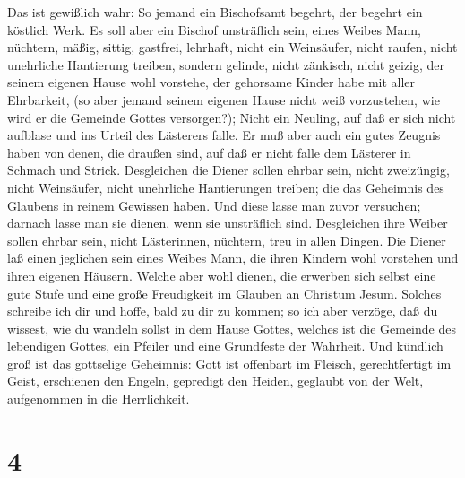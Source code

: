  Das ist gewißlich wahr: So jemand ein Bischofsamt begehrt,
der begehrt ein köstlich Werk.  Es soll aber ein Bischof
unsträflich sein, eines Weibes Mann, nüchtern, mäßig, sittig, gastfrei,
lehrhaft,  nicht ein Weinsäufer, nicht raufen, nicht
unehrliche Hantierung treiben, sondern gelinde, nicht zänkisch, nicht
geizig,  der seinem eigenen Hause wohl vorstehe, der
gehorsame Kinder habe mit aller Ehrbarkeit,  (so aber jemand
seinem eigenen Hause nicht weiß vorzustehen, wie wird er die Gemeinde
Gottes versorgen?);  Nicht ein Neuling, auf daß er sich
nicht aufblase und ins Urteil des Lästerers falle.  Er muß
aber auch ein gutes Zeugnis haben von denen, die draußen sind, auf daß
er nicht falle dem Lästerer in Schmach und Strick. 
Desgleichen die Diener sollen ehrbar sein, nicht zweizüngig, nicht
Weinsäufer, nicht unehrliche Hantierungen treiben;  die das
Geheimnis des Glaubens in reinem Gewissen haben.  Und diese
lasse man zuvor versuchen; darnach lasse man sie dienen, wenn sie
unsträflich sind.  Desgleichen ihre Weiber sollen ehrbar
sein, nicht Lästerinnen, nüchtern, treu in allen Dingen. 
Die Diener laß einen jeglichen sein eines Weibes Mann, die ihren Kindern
wohl vorstehen und ihren eigenen Häusern.  Welche aber wohl
dienen, die erwerben sich selbst eine gute Stufe und eine große
Freudigkeit im Glauben an Christum Jesum.  Solches schreibe
ich dir und hoffe, bald zu dir zu kommen;  so ich aber
verzöge, daß du wissest, wie du wandeln sollst in dem Hause Gottes,
welches ist die Gemeinde des lebendigen Gottes, ein Pfeiler und eine
Grundfeste der Wahrheit.  Und kündlich groß ist das
gottselige Geheimnis: Gott ist offenbart im Fleisch, gerechtfertigt im
Geist, erschienen den Engeln, gepredigt den Heiden, geglaubt von der
Welt, aufgenommen in die Herrlichkeit.

\hypertarget{section-3}{%
\section{4}\label{section-3}}

